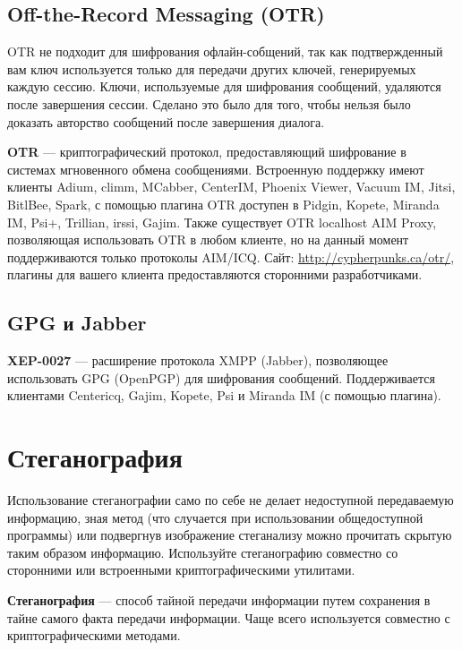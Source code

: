 \subsection{Off-the-Record Messaging (OTR)}
\begin{important}
OTR не подходит для шифрования офлайн-собщений, так как подтвержденный вам ключ используется только для передачи других ключей, генерируемых каждую сессию. Ключи, используемые для шифрования сообщений, удаляются после завершения сессии. Сделано это было для того, чтобы нельзя было доказать авторство сообщений после завершения диалога.
\end{important}
\textbf{OTR} --- криптографический протокол, предоставляющий шифрование в системах мгновенного обмена сообщениями. Встроенную поддержку имеют клиенты Adium, climm, MCabber, CenterIM, Phoenix Viewer, Vacuum IM, Jitsi, BitlBee, Spark, с помощью плагина OTR доступен в Pidgin\cite{otr-pidgin}, Kopete\cite{otr-kopete}, Miranda IM\cite{otr-miranda}, Psi+\cite{otr-psi}, Trillian\cite{otr-trillian}, irssi\cite{otr-irssi}, Gajim\cite{otr-gajim}. Также существует OTR localhost AIM Proxy, позволяющая использовать OTR в любом клиенте, но на данный момент поддерживаются только протоколы AIM/ICQ. Сайт: \url{http://cypherpunks.ca/otr/}, плагины для вашего клиента предоставляются сторонними разработчиками.
\subsection{GPG и Jabber}
\textbf{XEP-0027} --- расширение протокола XMPP (Jabber), позволяющее использовать GPG (OpenPGP) для шифрования сообщений\cite{xep-0027}. Поддерживается клиентами Centericq, Gajim, Kopete, Psi и Miranda IM (с помощью плагина).

\section{Стеганография}
\begin{important}
Использование стеганографии само по себе не делает недоступной передаваемую информацию, зная метод (что случается при использовании общедоступной программы) или подвергнув изображение стеганализу можно прочитать скрытую таким образом информацию. Используйте стеганографию совместно со сторонними или встроенными криптографическими утилитами.
\end{important}
\textbf{Стеганография} --- способ тайной передачи информации путем сохранения в тайне самого факта передачи информации. Чаще всего используется совместно с криптографическими методами.
